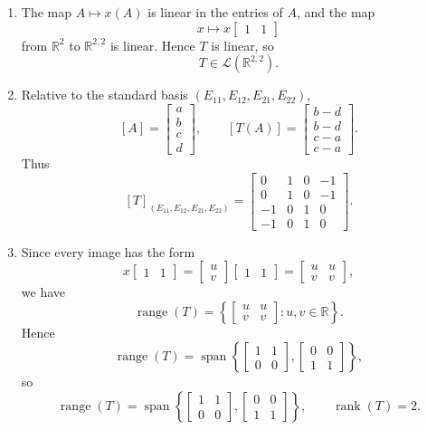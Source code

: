 \documentclass[12pt]{article}
\newcommand{\R}{\mathbb{R}}
\newcommand{\cL}{\mathcal{L}}
\DeclareMathOperator{\Range}{range}
\DeclareMathOperator{\Rank}{rank}
\begin{document}
\begin{enumerate}[label=(\alph*)]
\item The map \(A\mapsto x(A)\) is linear in the entries of \(A\), and the map
\[
x\mapsto x\begin{bmatrix}1&1\end{bmatrix}
\]
from \(\R^2\) to \(\R^{2,2}\) is linear. Hence \(T\) is linear, so
\[
T\in\cL(\R^{2,2}).
\]

\item Relative to the standard basis \((E_{11},E_{12},E_{21},E_{22})\),
\[
[A]=\begin{bmatrix}a\\b\\c\\d\end{bmatrix},
\qquad
[T(A)]=\begin{bmatrix}b-d\\b-d\\c-a\\c-a\end{bmatrix}.
\]
Thus
\[
\boxed{
[T]_{(E_{11},E_{12},E_{21},E_{22})}
=
\begin{bmatrix}
0&1&0&-1\\
0&1&0&-1\\
-1&0&1&0\\
-1&0&1&0
\end{bmatrix}.}
\]

\item Since every image has the form
\[
x\begin{bmatrix}1&1\end{bmatrix}
=
\begin{bmatrix}u\\v\end{bmatrix}\begin{bmatrix}1&1\end{bmatrix}
=
\begin{bmatrix}u&u\\v&v\end{bmatrix},
\]
we have
\[
\Range(T)=
\left\{
\begin{bmatrix}u&u\\v&v\end{bmatrix}:u,v\in\R
\right\}.
\]
Hence
\[
\Range(T)=
\operatorname{span}\left\{
\begin{bmatrix}1&1\\0&0\end{bmatrix},
\begin{bmatrix}0&0\\1&1\end{bmatrix}
\right\},
\]
so
\[
\boxed{
\Range(T)=
\operatorname{span}\left\{
\begin{bmatrix}1&1\\0&0\end{bmatrix},
\begin{bmatrix}0&0\\1&1\end{bmatrix}
\right\},
\qquad
\Rank(T)=2.}
\]


\end{enumerate}
\end{document}
